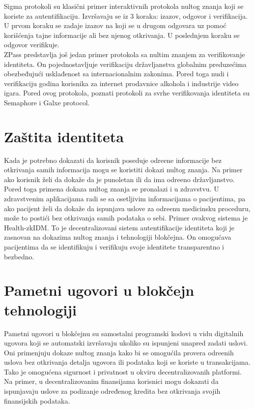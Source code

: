 \textenglish{Sigma} protokoli su klasični primer interaktivnih protokola nultog znanja koji se koriste za autentifikaciju\cite{inbook}. Izvršavaju se iz 3 koraka: izazov, odgovor i verifikacija. U prvom koraku se zadaje izazov na koji se u drugom odgovara uz pomoć korišćenja tajne informacije ali bez njenog otkrivanja. U poslednjem koraku se odgovor verifikuje.\\

\textenglish{ZPass} predstavlja još jedan primer protokola sa nultim znanjem za verifikovanje identiteta. On pojednostavljuje verifikaciju državljanstva globalnim preduzećima obezbeđujući usklađenost sa internacionalnim zakonima. Pored toga nudi i verifikaciju godina korisnika za internet prodavnice alkohola i industrije video igara\cite{zpass}. Pored ovog protokola, poznati protokoli za svrhe verifikovanja identiteta su \textenglish{Semaphore}\cite{semaforrad, semwrl} i \textenglish{Galxe protocol}\cite{galxe}. 



\section{Za\v stita identiteta}
Kada je potrebno dokazati da korisnik poseduje odre\dj ene informacije bez otkrivanja samih informacija mogu se koristiti dokazi nultog znanja. Na primer ako korisnik \v zeli da doka\v ze da je punoletan ili da ima odre\dj eno dr\v zavljanstvo. \\

Pored toga primena dokaza nultog znanja se pronalazi i u zdravstvu. U zdravstvenim aplikacijama radi se sa osetljivim informacijama o pacijentima, pa ako pacijent \v zeli da doka\v ze da ispunjava uslove za odre\dj enu medicinsku proceduru, mo\v ze to posti\' ci bez otkrivanja samih podataka o sebi. Primer ovakvog sistema je \textenglish{Health-zkIDM}. To je decentralizovani sistem autentifikacije identiteta koji je zasnovan na dokazima nultog znanja i tehnologiji blokčejna. On omogućava pacijentima da se identifikuju i verifikuju svoje identitete transparentno i bezbedno\cite{s22207716}. 

\section{Pametni ugovori u blokčejn tehnologiji}
Pametni ugovori u blokčejnu su samostalni programski kodovi u vidu digitalnih ugovora koji se automatski izvršavaju ukoliko su ispunjeni unapred zadati uslovi. Oni primenjuju dokaze nultog znanja kako bi se omogu\' cila provera odre\dj enih uslova bez otkrivanja detalja ugovora ili podataka koji se koriste u transakcijama. Tako je omogu\' cena sigurnost i privatnost u okviru decentralizovanih platformi. Na primer, u decentralizovanim finansijama korisnici mogu dokazati da ispunjavaju uslove za podizanje određenog kredita bez otkrivanja svojih finansijskih podataka\cite{inMaobook}.

